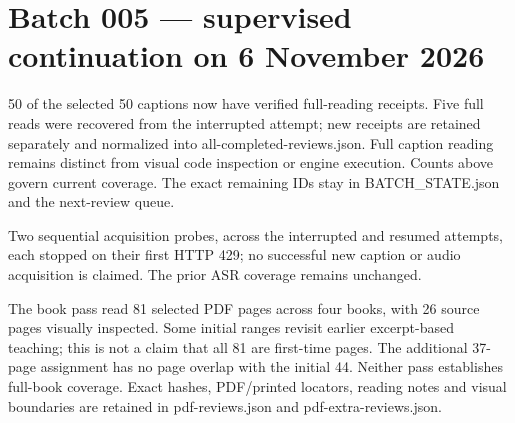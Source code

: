 \section{Batch 005 --- supervised continuation on 6 November 2026}\label{appendix-877738f6f4d2-batch-005-supervised-continuation-on-6-november-2026}

50 of the selected 50 captions now have verified full-reading receipts. Five full reads were recovered from the interrupted attempt; new receipts are retained separately and normalized into all-completed-reviews.json. Full caption reading remains distinct from visual code inspection or engine execution. Counts above govern current coverage. The exact remaining IDs stay in BATCH\_STATE.json and the next-review queue.

Two sequential acquisition probes, across the interrupted and resumed attempts, each stopped on their first HTTP 429; no successful new caption or audio acquisition is claimed. The prior ASR coverage remains unchanged.

The book pass read 81 selected PDF pages across four books, with 26 source pages visually inspected. Some initial ranges revisit earlier excerpt-based teaching; this is not a claim that all 81 are first-time pages. The additional 37-page assignment has no page overlap with the initial 44. Neither pass establishes full-book coverage. Exact hashes, PDF/printed locators, reading notes and visual boundaries are retained in pdf-reviews.json and pdf-extra-reviews.json.

